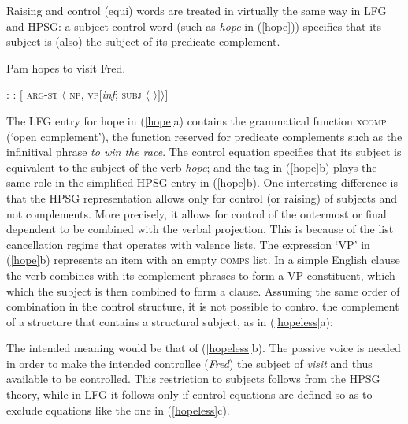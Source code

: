 Raising and control (equi) words are treated in virtually the same way in LFG and HPSG: a subject control word (such as \textit{hope} in (\ref{hope})) specifies that its subject is (also) the subject of its predicate complement.  

\begin{exe} 
\ex	\label{hope}
Pam hopes to visit Fred.
\begin{xlist} 
\ex	
{}: \qquad {}
\ex 
{}:  \qquad  $[$ \textsc{arg-st} $\langle$ \textsc{np}, \textsc{vp}[\textit{inf}; \textsc{subj} $\langle$  $ \rangle ] \rangle ]$
\end{xlist}
\end{exe}
The LFG entry for hope in (\ref{hope}a) contains the grammatical function \textsc{xcomp} (`open complement'), the function reserved for predicate complements such as the infinitival phrase \textit{to win the race}.  The control equation specifies that its subject is equivalent to the subject of the verb \textit{hope}; and the  tag  in (\ref{hope}b) plays the same role in the simplified HPSG entry in (\ref{hope}b).  One interesting difference is that the HPSG representation allows only for control (or raising) of subjects and not complements.  More precisely, it allows for control of the outermost or final dependent to be combined with the verbal projection.  This is because of the list cancellation regime that operates with valence lists.  The expression `VP' in  (\ref{hope}b) represents an item with an empty \textsc{comps} list.  In a simple English clause the verb combines with its complement phrases to form a VP constituent, which which the subject is then combined to form a clause.  Assuming the same order of combination in the control structure, it is not possible to control the complement of a structure that contains a structural subject, as in (\ref{hopeless}a):

\begin{exe} 
\ex 
\label{hopeless}
\begin{xlist}
\end{xlist}
\end{exe}
The intended meaning would be that of (\ref{hopeless}b).  The passive voice is needed in order to make the intended controllee (\textit{Fred})  the subject of \textit{visit} and thus available to be controlled.  This restriction to subjects follows from the HPSG theory, while in LFG it follows only if control equations are defined so as to exclude equations like the one in (\ref{hopeless}c).    

